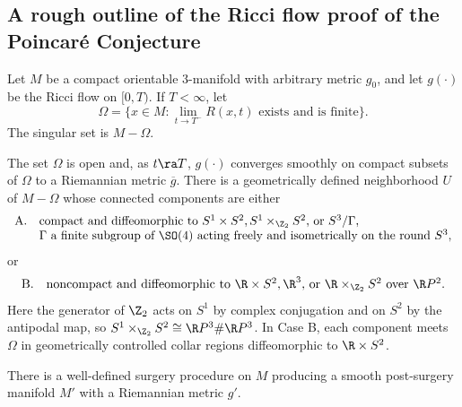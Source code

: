 \subsection{A rough outline of the Ricci flow proof of the Poincar\'e
Conjecture}

Let $M$ be a compact orientable $3$-manifold with arbitrary metric $g_0$, and
let $g(\cdot)$ be the Ricci flow on $[0,T)$.  If $T<\infty$, let
\[
\Omega=\{x\in M:\lim_{t\rightarrow T^-}R(x,t)\text{ exists and is finite}\}.
\]
The singular set is $M-\Omega$.

\begin{proposition}
  \label{prop:kl-overview-ricci-flow-approach-manifold-geometrization-existence-riemannian-metrics}
 \cite{Perelman2} \label{introclaim1}
The set $\Omega$ is open and, as $t\ra T$, $g(\cdot)$ converges smoothly on
compact subsets of $\Omega$ to a Riemannian metric $\overline g$.  There is a
geometrically defined neighborhood $U$ of $M-\Omega$ whose connected
components are either
\[
\begin{array}{ll}
\mathrm{A}.&\text{compact and diffeomorphic to }S^1\times S^2,
S^1\times_{\Z_2}S^2\text{, or }S^3/\Gamma,\\
&\Gamma\text{ a finite subgroup of }\SO(4)\text{ acting freely and
isometrically on the round }S^3,
\end{array}
\]
or
\[
\begin{array}{ll}
\mathrm{B}.&\text{noncompact and diffeomorphic to }\R\times S^2,
\R^3\text{, or }\R\times_{\Z_2}S^2\text{ over }\R P^2.
\end{array}
\]
Here the generator of $\Z_2$ acts on $S^1$ by complex conjugation and on
$S^2$ by the antipodal map, so
$S^1\times_{\Z_2}S^2\cong\R P^3\#\R P^3$.  In Case B, each component
meets $\Omega$ in geometrically controlled collar regions diffeomorphic to
$\R\times S^2$.
\end{proposition}

\begin{proposition}
  \label{prop:kl-overview-ricci-flow-approach-manifold-geometrization-existence-ricci-flow-surgery}
 \cite{Perelman2} \label{introclaim2}
There is a well-defined surgery procedure on $M$ producing a smooth
post-surgery manifold $M'$ with a Riemannian metric $g'$.
\end{proposition}

